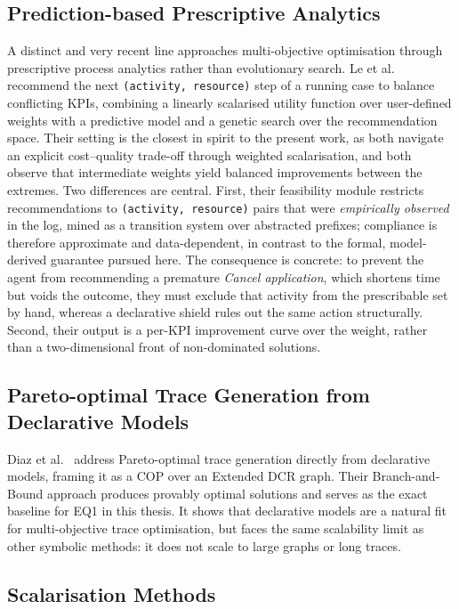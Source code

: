 \subsection{Prediction-based Prescriptive Analytics}
\label{sec:lit_prpa}

A distinct and very recent line approaches multi-objective optimisation
through prescriptive process analytics rather than evolutionary search.
Le et al.~\cite{Le2026BalancingAnalytics} recommend the next
\texttt{(activity, resource)} step of a running case to balance
conflicting KPIs, combining a linearly scalarised utility function over
user-defined weights with a predictive model and a genetic search over
the recommendation space. Their setting is the closest in spirit to the
present work, as both navigate an explicit cost--quality trade-off
through weighted scalarisation, and both observe that intermediate
weights yield balanced improvements between the extremes. Two
differences are central. First, their feasibility module restricts
recommendations to \texttt{(activity, resource)} pairs that were
\emph{empirically observed} in the log, mined as a transition system
over abstracted prefixes; compliance is therefore approximate and
data-dependent, in contrast to the formal, model-derived guarantee
pursued here. The consequence is concrete: to prevent the agent from
recommending a premature \emph{Cancel application}, which shortens time
but voids the outcome, they must exclude that activity from the
prescribable set by hand, whereas a declarative shield rules out the
same action structurally. Second, their output is a per-KPI improvement
curve over the weight, rather than a two-dimensional front of
non-dominated solutions.

\subsection{Pareto-optimal Trace Generation from Declarative Models}

Diaz et al.~\cite{Diaz2024Pareto-OptimalModels} address Pareto-optimal
trace generation directly from declarative models, framing it as a
\ac{COP} over an Extended \ac{DCR} graph. Their Branch-and-Bound
approach produces provably optimal solutions and serves as the exact
baseline for EQ1 in this thesis. It shows that declarative models are a
natural fit for multi-objective trace optimisation, but faces the same
scalability limit as other symbolic methods: it does not scale to large
graphs or long traces.

\subsection{Scalarisation Methods}
\label{sec:lit_scalarisation_methods}

